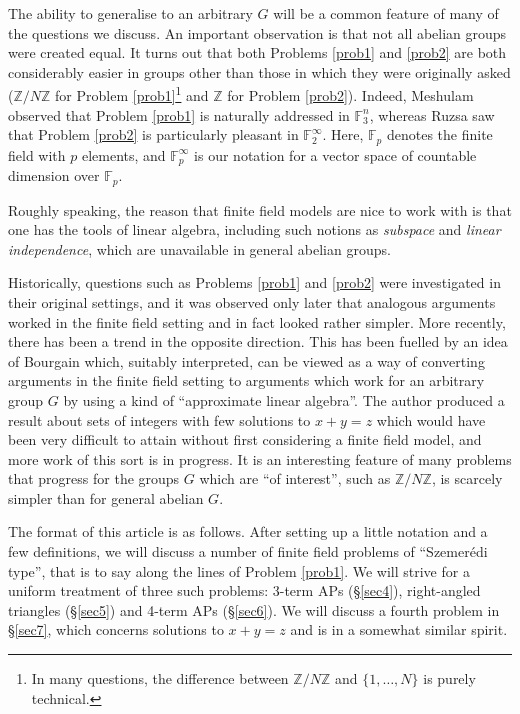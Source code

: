 \documentclass[12pt,a4paper,reqno]{amsart}
\numberwithin{equation}{section}
\theoremstyle{plain}
\theoremstyle{definition}
\begin{document}
\noindent The ability to generalise to an arbitrary $G$ will be a common feature of many of the questions we discuss. An important observation is that not all abelian groups were created equal. It turns out that both Problems \ref{prob1} and \ref{prob2} are both considerably easier in groups other than those in which they were originally asked ($\mathbb{Z}/N\mathbb{Z}$ for Problem \ref{prob1}\footnote{In many questions, the difference between $\mathbb{Z}/N\mathbb{Z}$ and $\{1,\dots,N\}$ is purely technical.} and $\mathbb{Z}$ for Problem \ref{prob2}). 
Indeed, Meshulam \cite{meshulam} observed that Problem \ref{prob1} is naturally addressed in $\mathbb{F}_3^n$, whereas Ruzsa \cite{ruzsa-freimangroups} saw that Problem \ref{prob2} is particularly pleasant in $\mathbb{F}_2^{\infty}$.  Here, $\mathbb{F}_p$ denotes the finite field with $p$ elements, and $\mathbb{F}_p^{\infty}$ is our notation for a vector space of countable dimension over $\mathbb{F}_p$.\vspace{11pt}

\noindent Roughly speaking, the reason that finite field models are nice to work with is that one has the tools of linear algebra, including such notions as \textit{subspace} and \textit{linear independence}, which are unavailable in general abelian groups.\vspace{11pt}

\noindent Historically, questions such as Problems \ref{prob1} and \ref{prob2} were investigated in their original settings, and it was observed only later that analogous arguments worked in the finite field setting and in fact looked rather simpler. More recently, there has been a trend in the opposite direction. This has been fuelled by an idea of Bourgain \cite{bourgain2} which, suitably interpreted, can be viewed as a way of converting arguments in the finite field setting to arguments which work for an arbitrary group $G$ by using a kind of ``approximate linear algebra''. The author \cite{green-reg} produced a result about sets of integers with few solutions to $x + y = z$ which would have been very difficult to attain without first considering a finite field model, and more work of this sort is in progress. It is an interesting feature of many problems that progress for the groups $G$ which are ``of interest'', such as $\mathbb{Z}/N\mathbb{Z}$, is scarcely simpler than for general abelian $G$.\vspace{11pt}

\noindent The format of this article is as follows. After setting up a little notation and a few definitions, we will discuss a number of finite field problems of ``Szemer\'edi type'', that is to say along the lines of Problem \ref{prob1}. We will strive for a uniform treatment of three such problems: 3-term APs (\S \ref{sec4}), right-angled triangles (\S \ref{sec5}) and 4-term APs (\S \ref{sec6}). We will discuss a fourth problem in \S \ref{sec7}, which concerns solutions to $x + y = z$ and is in a somewhat similar spirit.\vspace{11pt}
\end{document}
